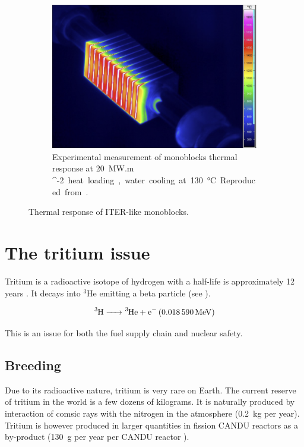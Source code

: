 \begin{figure} [h]
\begin{subfigure}[t]{0.45\linewidth}
            \includegraphics[width=\linewidth]{Figures/Chapter1/monoblock_experimental_temperature_field.png}
            \caption{Experimental measurement of monoblocks thermal response at \SI{20}{MW.m ^{-2}} heat loading, water cooling at \SI{130}{\celsius}. Reproduced from \cite{visca_manufacturing_2018}.}
    \end{subfigure}
    \caption{Thermal response of ITER-like monoblocks.}
\end{figure}

\section{The tritium issue} \label{the tritium issue}

Tritium is a radioactive isotope of hydrogen with a half-life is approximately 12 years .
It decays into $^3$He emitting a beta particle (see ).

\begin{equation}
    \ce{^3H -> ^3He + e^- (\SI{0.018590}{MeV})}
    \labeq{tritium decay}
\end{equation}

This is an issue for both the fuel supply chain and nuclear safety.

\subsection{Breeding}
Due to its radioactive nature, tritium is very rare on Earth.
The current reserve of tritium in the world is a few dozens of kilograms.
It is naturally produced by interaction of comsic rays with the nitrogen in the atmosphere (\SI{0.2}{kg} per year).
Tritium is however produced in larger quantities in fission CANDU reactors as a by-product (\SI{130}{g} per year per CANDU reactor ).

